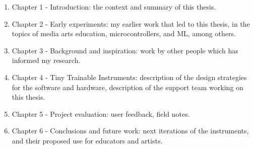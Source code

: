 \begin{enumerate}
  \item Chapter 1 - Introduction: the context and summary of this thesis.
  \item Chapter 2 - Early experiments: my earlier work that led to this thesis, in the topics of media arts education, microcontrollers, and \acrshort{ML}, among others.
  \item Chapter 3 - Background and inspiration: work by other people which has informed my research.
  \item Chapter 4 - Tiny Trainable Instruments: description of the design strategies for the software and hardware, description of the support team working on this thesis.
  \item Chapter 5 - Project evaluation: user feedback, field notes.
  \item Chapter 6 - Conclusions and future work: next iterations of the instruments, and their proposed use for educators and artists.
  \end{enumerate}
